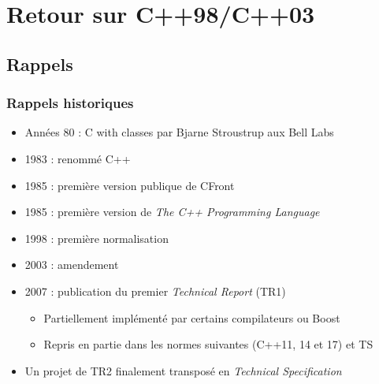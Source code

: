 \documentclass[C++.tex]{subfiles}
\begin{document}
\section{Retour sur C++98/C++03}
\subsection*{Rappels}
\begin{frame}
	\frametitle{Rappels historiques}
	\begin{itemize}
		\item Années 80 : \og C with classes\fg{} par Bjarne Stroustrup aux Bell Labs
		\item 1983 : renommé C++
		\item 1985 : première version publique de CFront 
		\item 1985 : première version de \textit{The C++ Programming Language} 
		\item 1998 : première normalisation
		\item 2003 : amendement
		\item 2007 : publication du premier \textit{Technical Report} (TR1)
		
		
		\begin{itemize}
			\item Partiellement implémenté par certains compilateurs ou Boost
			\item Repris en partie dans les normes suivantes (C++11, 14 et 17) et TS
			
			
		\end{itemize}
		\item Un projet de TR2 finalement transposé en \textit{Technical Specification}
		
	\end{itemize}
\end{frame}
\end{document}
